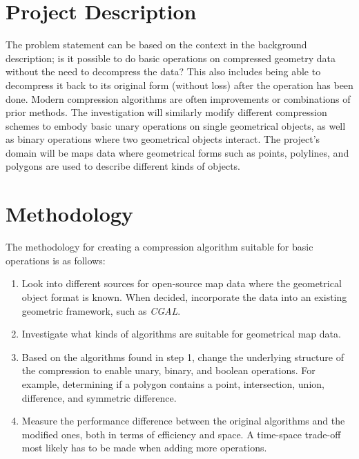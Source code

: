 \documentclass{article}
\begin{document}
\section{Project Description}
The problem statement can be based on the context in the background description; is it possible to do basic operations on compressed geometry data without the need to decompress the data? This also includes being able to decompress it back to its original form (without loss) after the operation has been done. Modern compression algorithms are often improvements or combinations of prior methods. The investigation will similarly modify different compression schemes to embody basic unary operations on single geometrical objects, as well as binary operations where two geometrical objects interact. The project's domain will be maps data where geometrical forms such as points, polylines, and polygons are used to describe different kinds of objects.

\section{Methodology}
The methodology for creating a compression algorithm suitable for basic operations is as follows:

\begin{enumerate}

    \item Look into different sources for open-source map data where the geometrical object format is known. When decided, incorporate the data into an existing geometric framework, such as \emph{CGAL}.
    
  \item Investigate what kinds of algorithms are suitable for geometrical map data.
  
  \item Based on the algorithms found in step 1, change the underlying structure of the compression to enable unary, binary, and boolean operations. For example, determining if a polygon contains a point, intersection, union, difference, and symmetric difference.
  
  \item Measure the performance difference between the original algorithms and the modified ones, both in terms of efficiency and space. A time-space trade-off most likely has to be made when adding more operations.

\end{enumerate}
\end{document}
